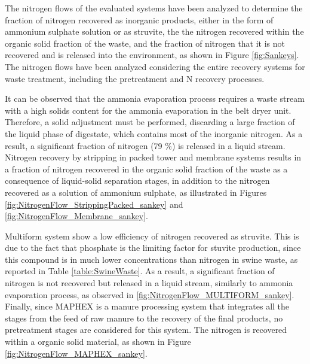 \begin{refsection}[referencesCh6]
The nitrogen flows of the evaluated systems have been analyzed to determine the fraction of nitrogen recovered as inorganic products, either in the form of ammonium sulphate solution or as struvite, the the nitrogen recovered within the organic solid fraction of the waste, and the fraction of nitrogen that it is not recovered and is released into the environment, as shown in Figure \ref{fig:Sankeys}. The nitrogen flows have been analyzed considering the entire recovery systems for waste treatment, including the pretreatment and N recovery processes.

It can be observed that the
ammonia evaporation process
requires a waste stream with a high solids content for the ammonia evaporation in the belt dryer unit.
Therefore, a solid adjustment must be performed, 
discarding a large fraction of the liquid phase of digestate, which contains most of the inorganic nitrogen. As a result, a significant fraction of nitrogen (79 \%) is released in a liquid stream. Nitrogen recovery by stripping in packed tower and membrane systems results in a fraction of nitrogen recovered in the organic solid fraction of the waste as a consequence of liquid-solid separation stages, in addition to the nitrogen recovered as a solution of ammonium sulphate, as illustrated in Figures \ref{fig:NitrogenFlow_StrippingPacked_sankey} and \ref{fig:NitrogenFlow_Membrane_sankey}. 

Multiform system show a low efficiency of nitrogen recovered as struvite. This is due to the fact that phosphate is the limiting factor for stuvite production, since this compound is in much lower concentrations than nitrogen in swine waste, as reported in Table \ref{table:SwineWaste}. As a result, a significant fraction of nitrogen is not recovered but released in a liquid stream, similarly to ammonia evaporation process, as observed in \ref{fig:NitrogenFlow_MULTIFORM_sankey}.
Finally, since MAPHEX is a manure processing system that integrates all the stages from the feed of raw manure to the recovery of the final products, no pretreatment stages are considered for this system. The nitrogen is recovered within a organic solid material, as shown in Figure \ref{fig:NitrogenFlow_MAPHEX_sankey}. 


\end{refsection}
